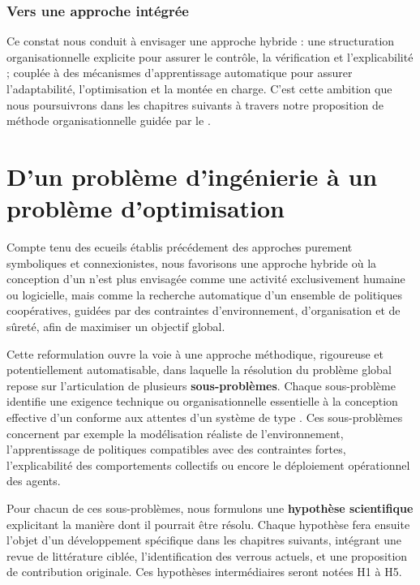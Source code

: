 \subsection*{Vers une approche intégrée}

Ce constat nous conduit à envisager une approche hybride : une structuration organisationnelle explicite pour assurer le contrôle, la vérification et l'explicabilité ; couplée à des mécanismes d'apprentissage automatique pour assurer l'adaptabilité, l'optimisation et la montée en charge. C'est cette ambition que nous poursuivrons dans les chapitres suivants à travers notre proposition de méthode organisationnelle guidée par le .



\chapter{D'un problème d'ingénierie à un problème d'optimisation}\label{chap:hypotheses}

% 

Compte tenu des ecueils établis précédement des approches purement symboliques et connexionistes, nous favorisons une approche hybride où la conception d'un  n'est plus envisagée comme une activité exclusivement humaine ou logicielle, mais comme la recherche automatique d'un ensemble de politiques coopératives, guidées par des contraintes d'environnement, d'organisation et de sûreté, afin de maximiser un objectif global.

Cette reformulation ouvre la voie à une approche méthodique, rigoureuse et potentiellement automatisable, dans laquelle la résolution du problème global repose sur l'articulation de plusieurs \textbf{sous-problèmes}. Chaque sous-problème identifie une exigence technique ou organisationnelle essentielle à la conception effective d'un  conforme aux attentes d'un système de type . Ces sous-problèmes concernent par exemple la modélisation réaliste de l'environnement, l'apprentissage de politiques compatibles avec des contraintes fortes, l'explicabilité des comportements collectifs ou encore le déploiement opérationnel des agents.

Pour chacun de ces sous-problèmes, nous formulons une \textbf{hypothèse scientifique} explicitant la manière dont il pourrait être résolu. Chaque hypothèse fera ensuite l'objet d'un développement spécifique dans les chapitres suivants, intégrant une revue de littérature ciblée, l'identification des verrous actuels, et une proposition de contribution originale. Ces hypothèses intermédiaires seront notées H1 à H5.

